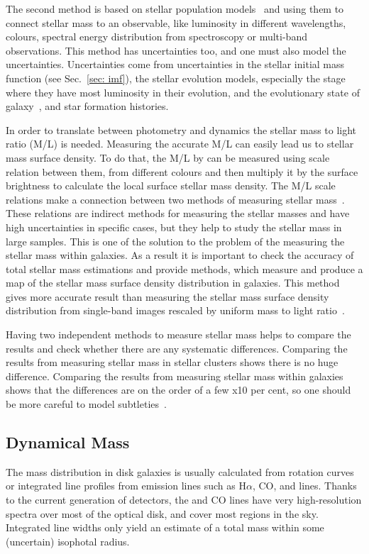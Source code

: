 The second method is based on stellar population models~\citep[e.g.][]{ Bruzual93, Kotulla09} and using them to connect stellar mass to an observable, like luminosity in different wavelengths, colours, spectral energy distribution from spectroscopy or multi-band observations. 
This method has uncertainties too, and one must also model the uncertainties. 
Uncertainties come from uncertainties in the stellar initial mass function (see Sec.~\ref{sec: imf}), the stellar evolution models, especially the stage where they have most luminosity in their evolution, and the evolutionary state of galaxy~\citep[see,][]{Dalcanton12}, and star formation histories. 

In order to translate between photometry and dynamics the stellar mass to light ratio (M/L) is needed. 
Measuring the accurate M/L can easily lead us to stellar mass surface density.  
To do that, the M/L by can be measured using scale relation between them, from different colours and then multiply it by the surface brightness to calculate the local surface stellar mass density. 
The M/L scale relations make a connection between two methods of measuring stellar mass~\citep{Bell03}. 
These relations are indirect methods for measuring the stellar masses and have high uncertainties in specific cases, but they help to study the stellar mass in large samples. 
This is one of the solution to the problem of the measuring the stellar mass within galaxies. 
As a result it is important to check the accuracy of total stellar mass estimations and provide methods, which measure and produce a map of the stellar mass surface density distribution in galaxies. 
This method gives more accurate result than measuring the stellar mass surface density distribution from single-band images rescaled by uniform mass to light ratio~\citep{Zibetti09}.
 
Having two independent methods to measure stellar mass helps to compare the results and check whether there are any systematic differences. 
Comparing the results from measuring stellar mass in stellar clusters shows there is no huge difference. 
Comparing the results from measuring stellar mass within galaxies shows that the differences are on the order of a few x10 per cent, so one should be more careful to model subtleties~\citep{McLaughlin05}. 

\subsection{Dynamical Mass}
The mass distribution in disk galaxies is usually calculated from rotation curves or integrated line profiles from emission lines such as H${\alpha}$, CO, and \hi lines. 
Thanks to the current generation of detectors, the \halpha and CO lines have very high-resolution spectra over most of the optical disk, and cover most regions in the sky. 
Integrated line widths only yield an estimate of a total mass within some (uncertain) isophotal radius.

